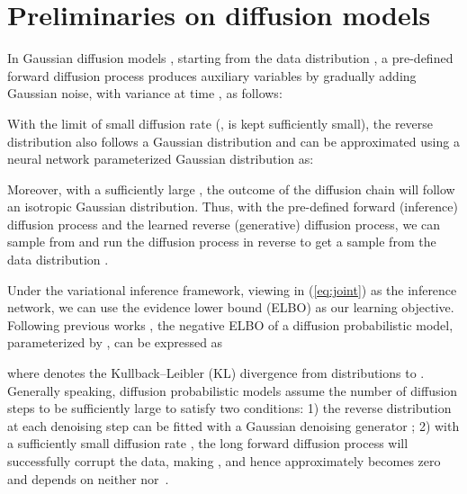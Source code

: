 \documentclass{article} \usepackage{iclr2023_conference,times}
\newcommand{\ba}[1]{}
\newcommand{\beq}[1]{}
\newcommand{\given}{\,|\,}
\def\Eqref#1{(\ref{#1})}
\def\rvx{{\mathbf{x}}}
\def\mI{{\bm{I}}}
\def\gL{{\mathcal{L}}}
\newcommand{\E}{\mathbb{E}}
\newcommand{\KL}{D_{\mathrm{KL}}}
\theoremstyle{plain}
\theoremstyle{definition}
\theoremstyle{remark}
\begin{document}
\section{Preliminaries on diffusion  models}\label{sec:background}
In Gaussian diffusion  models \citep{diffusion,ddpm}, starting from the data distribution ,  a pre-defined forward diffusion process   produces auxiliary variables  by gradually adding Gaussian noise, with variance  at time , as follows:
\ba{
 q(\rvx_1, ..., \rvx_T \given \rvx_0) &\coloneqq    \textstyle\prod_{t=1}^{T} q(\rvx_t \given \rvx_{t-1}) \label{eq:joint} ,~~~
    q(\rvx_t \given \rvx_{t-1}) \coloneqq \mathcal{N}(\rvx_t; \sqrt{1-\beta_t} \rvx_{t-1}, \beta_t \mI). }
With the limit of small diffusion rate (,  is kept sufficiently small), the reverse distribution   also follows a Gaussian distribution \citep{feller1949theory,diffusion} and can be approximated using a neural network parameterized Gaussian distribution  as:
\beq{
\label{eq:nn}
p_{\theta}(\rvx_{t-1}\given \rvx_t) \coloneqq \mathcal{N}(\rvx_{t-1}; \mu_{\theta}(\rvx_t, t), \Sigma_{\theta}(\rvx_t, t)).
}
Moreover, with a  sufficiently large , the outcome of the diffusion chain  will follow an isotropic Gaussian distribution. Thus, with the pre-defined forward (inference) diffusion process and the learned reverse (generative) diffusion process, we can sample from  and run the diffusion process in reverse to get a sample from the data distribution .

Under the variational inference \citep{kingma2013auto,blei2017variational} framework, viewing   in \Eqref{eq:joint} as the inference network, we can use the evidence lower bound (ELBO) as our learning objective. Following previous works \citep{diffusion,ddpm}, the negative ELBO of a diffusion probabilistic model, parameterized by , can be expressed as
\ba{
    \gL_{\text{ELBO}}(\theta) &\coloneqq \gL_0(\theta) +   \textstyle \sum_{t=2}^T\gL_{t-1}(\theta) + \gL_T \label{eq:loss},~~~\gL_0(\theta) \coloneqq \E_{q(\rvx_{0})}\E_{q(\rvx_{1}\given \rvx_0)} \left[-\log p_{\theta}(\rvx_0 \given  \rvx_1)\right] , \\
                     \gL_{t-1}(\theta)&\coloneqq 
                    \E_{q(\rvx_{0})}\E_{q(\rvx_{t}\given \rvx_0)} [ \KL\left({q(\rvx_{t-1}\given \rvx_t,\rvx_0)}||{p_{\theta}(\rvx_{t-1}\given \rvx_t)}\right) \label{eq:losst}],~~~t\in\{2,\ldots,T\} \\
                     \gL_T&\coloneqq \E_{q(\rvx_{0})} [ \KL\left({q(\rvx_T \given  \rvx_0)}||{p(\rvx_T)}\right)] \label{eq:lossT},
}
where  denotes the Kullback--Leibler (KL) divergence from distributions  to . Generally speaking, diffusion probabilistic models assume the number of diffusion steps  to be sufficiently large to satisfy two conditions: 1) the reverse distribution at each denoising step can be fitted with a Gaussian denoising generator ; 2) with a sufficiently small diffusion rate , the long forward diffusion process will successfully corrupt the data, making , and hence approximately  becomes zero and depends on neither  nor~. 
\end{document}
